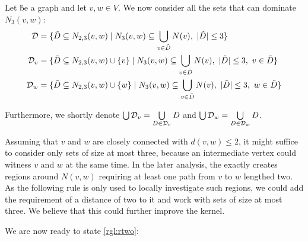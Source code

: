 \begin{definition}
Let \G be a graph and let $v,w \in V$. We now consider all the sets that can dominate $N_3(v,w)$:
\begin{align}
    \mathcal{D} & = \{ \tilde D \subseteq N_{2,3}(v,w)            \mid N_3(v,w) \subseteq \bigcup_{v \in \tilde D} N(v),\ |\tilde D| \leq 3                  \} \\
    \mathcal{D}_{v}  & = \{ \tilde D \subseteq N_{2,3}(v,w) \cup \{v\} \mid N_3(v,w) \subseteq \bigcup_{v \in \tilde D} N(v),\ |\tilde D| \leq 3,\ v \in \tilde D \} \\
    \mathcal{D}_{w}  & = \{ \tilde D \subseteq N_{2,3}(v,w) \cup \{w\} \mid N_3(v,w) \subseteq \bigcup_{v \in \tilde D} N(v),\ |\tilde D| \leq 3,\ w \in \tilde D \}
\end{align}

Furthermore, we shortly denote $\bigcup \mathcal{D}_{v} = \bigcup\limits_{D \in \mathcal{D}_{v}}D $ and $\bigcup \mathcal{D}_{w} = \bigcup\limits_{D \in \mathcal{D}_{w}}D$.
\end{definition}

Assuming that $v$ and $w$ are closely connected with $d(v,w) \leq 2$, it might suffice to consider only sets of size at most three, because an intermediate vertex could witness $v$ and $w$ at the same time. In the later analysis, the \dreg exactly creates regions around $N(v,w)$ requiring at least one path from $v$ to $w$ lengthed two. As the following rule is only used to locally investigate such regions, we could add the requirement of a distance of two to it and work with sets of size at most three. We believe that this could further improve the kernel. 

We are now ready to state \cref{rgl:rtwo}:

